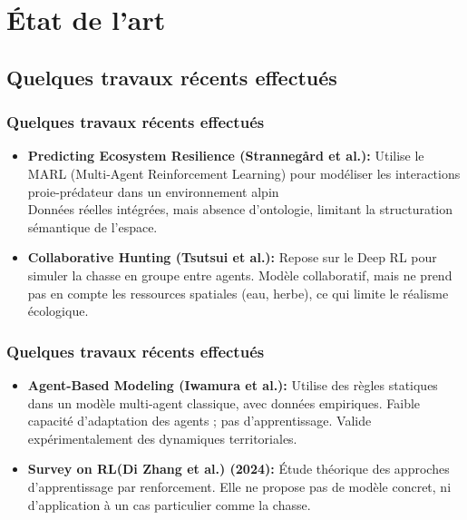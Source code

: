 \documentclass[11pt]{beamer}
\begin{document}
\section{État de l'art}
\subsection{Quelques travaux récents effectués}
\begin{frame}
    \frametitle{Quelques travaux récents effectués}
    \begin{itemize}
\item \textbf{Predicting Ecosystem Resilience (Strannegård et al.):} Utilise le MARL (Multi-Agent Reinforcement Learning) pour modéliser les interactions proie-prédateur dans un environnement alpin\\
Données réelles intégrées, mais  absence d’ontologie, limitant la structuration sémantique de l’espace.

\item \textbf{Collaborative Hunting (Tsutsui et al.):} Repose sur le Deep RL pour simuler la chasse en groupe entre agents.
Modèle collaboratif, mais  ne prend pas en compte les ressources spatiales (eau, herbe), ce qui limite le réalisme écologique.
\end{itemize}
\end{frame}
\begin{frame}
\frametitle{Quelques travaux récents effectués}
 \begin{itemize}
\item \textbf{Agent-Based Modeling (Iwamura et al.):}
Utilise des règles statiques dans un modèle multi-agent classique, avec données empiriques.
Faible capacité d’adaptation des agents ; pas d’apprentissage.
Valide expérimentalement des dynamiques territoriales.
\item   \textbf{Survey on RL(Di Zhang et al.) (2024):}
 Étude théorique des approches d’apprentissage par renforcement.
 Elle ne propose pas de modèle concret, ni d’application à un cas particulier comme la chasse.

 \end{itemize}   
\end{frame}
\end{document}
